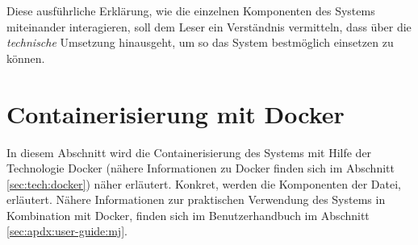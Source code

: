 Diese ausführliche Erklärung, wie die einzelnen Komponenten des Systems miteinander interagieren, soll dem Leser ein Verständnis vermitteln, dass über die \textit{technische} Umsetzung hinausgeht, um so das System bestmöglich einsetzen zu können.

\newpage
\section{Containerisierung mit Docker}\label{sec:impl:docker}
In diesem Abschnitt wird die Containerisierung des Systems mit Hilfe der Technologie Docker (nähere Informationen zu Docker finden sich im Abschnitt \ref{sec:tech:docker}) näher erläutert. Konkret, werden die Komponenten der  Datei, erläutert. Nähere Informationen zur praktischen Verwendung des Systems in Kombination mit Docker, finden sich im Benutzerhandbuch im Abschnitt \ref{sec:apdx:user-guide:mj}.\bigskip

